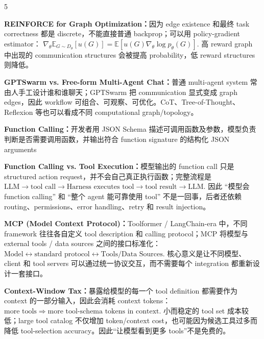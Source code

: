 \documentclass[a4paper, landscape]{article}
\begin{document}
\begin{multicols}{5}
\par \textbf{REINFORCE for Graph Optimization：}因为 edge existence 和最终 task correctness 都是 discrete，不能直接普通 backprop；可以用 policy-gradient estimator：
\(
\nabla_\theta \mathbb E_{G\sim D_\theta}[u(G)]
=
\mathbb E[
u(G)\nabla_\theta\log p_\theta(G)
].
\)
高 reward graph 中出现的 communication structures 会被提高 probability，低 reward structures 则降低。

\par \textbf{GPTSwarm vs. Free-form Multi-Agent Chat：}普通 multi-agent system 常由人手工设计谁和谁聊天；GPTSwarm 把 communication 显式变成 graph edges，因此 workflow 可组合、可观察、可优化。CoT、Tree-of-Thought、Reflexion 等也可以看成不同 computational graph/topology。

\par \textbf{Function Calling：}开发者用 JSON Schema 描述可调用函数及参数，模型负责判断是否需要调用函数，并输出符合 function signature 的结构化 JSON arguments

\par \textbf{Function Calling vs. Tool Execution：}模型输出的 function call 只是 structured action request，并不会自己真正执行函数；完整流程是
\(
\text{LLM}
\rightarrow
\text{tool call}
\rightarrow
\text{Harness executes tool}
\rightarrow
\text{tool result}
\rightarrow
\text{LLM}.
\)
因此 “模型会 function calling” 和 “整个 agent 能可靠使用 tool” 不是一回事，后者还依赖 routing、permissions、error handling、retry 和 result injection。

\par \textbf{MCP (Model Context Protocol)：}Toolformer / LangChain-era 中，不同 framework 往往各自定义 tool description 和 calling protocol；MCP 将模型与 external tools / data sources 之间的接口标准化：
\(
\text{Model} \leftrightarrow \text{standard protocol} \leftrightarrow \text{Tools/Data Sources}.
\)
核心意义是让不同模型、client 和 tool servers 可以通过统一协议交互，而不需要每个 integration 都重新设计一套接口。

\par \textbf{Context-Window Tax：}暴露给模型的每一个 tool definition 都需要作为 context 的一部分输入，因此会消耗 context tokens：
\(
\text{more tools}
\Rightarrow
\text{more tool-schema tokens in context}.
\)
小而稳定的 tool set 成本较低；large tool catalog 不仅增加 token/context cost，也可能因为候选工具过多而降低 tool-selection accuracy。因此“让模型看到更多 tools”不是免费的。


\end{multicols}
\end{document}
